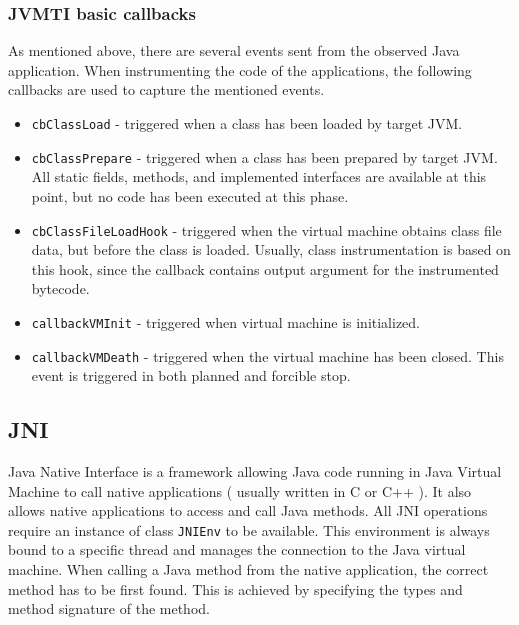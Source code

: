\subsubsection{JVMTI basic callbacks}
As mentioned above, there are several events sent from the observed Java application. When instrumenting the code of the applications, the following callbacks are used to capture the mentioned events.
\begin{itemize}
	\item \texttt{cbClassLoad} - triggered when a class has been loaded by target JVM.
	\item \texttt{cbClassPrepare} - triggered when a class has been prepared by target JVM. All static fields, methods, and implemented interfaces are available at this point, but no code has been executed at this phase.
	\item \texttt{cbClassFileLoadHook} - triggered when the virtual machine obtains class file data, but before the class is loaded. Usually, class instrumentation is based on this hook, since the callback contains output argument for the instrumented bytecode.
	\item  \texttt{callbackVMInit} - triggered when virtual machine is initialized.
	\item  \texttt{callbackVMDeath} - triggered when the virtual machine has been closed. This event is triggered in both planned and forcible stop.
\end{itemize}

\subsection{JNI}
\label{JNI}
Java Native Interface is a framework allowing Java code running in Java Virtual Machine to call native applications ( usually written in C or C++ ). It also allows native applications to access and call Java methods. All JNI operations require an instance of class \texttt{JNIEnv} to be available. This environment is always bound to a specific thread and manages the connection to the Java virtual machine. When calling a Java method from the native application, the correct method has to be first found. This is achieved by specifying the types and method signature of the method.
